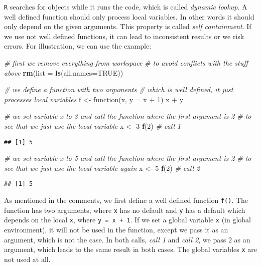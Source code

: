 \documentclass[11,]{article}
\newenvironment{Shaded}{\begin{snugshade}}{\end{snugshade}}
\newcommand{\KeywordTok}[1]{\textcolor[rgb]{0.13,0.29,0.53}{\textbf{{#1}}}}
\newcommand{\DataTypeTok}[1]{\textcolor[rgb]{0.13,0.29,0.53}{{#1}}}
\newcommand{\DecValTok}[1]{\textcolor[rgb]{0.00,0.00,0.81}{{#1}}}
\newcommand{\StringTok}[1]{\textcolor[rgb]{0.31,0.60,0.02}{{#1}}}
\newcommand{\CommentTok}[1]{\textcolor[rgb]{0.56,0.35,0.01}{\textit{{#1}}}}
\newcommand{\OtherTok}[1]{\textcolor[rgb]{0.56,0.35,0.01}{{#1}}}
\newcommand{\NormalTok}[1]{{#1}}
\begin{document}
\texttt{R} searches for objects while it runs the code, which is called
\emph{dynamic lookup}. A well defined function should only process local
variables. In other words it should only depend on the given arguments.
This property is called \emph{self containment}. If we use not well
defined functions, it can lead to inconsistent results or we risk
errors. For illustration, we can use the example:

\begin{Shaded}
\begin{Highlighting}[]
\CommentTok{# first we remove everything from workspace}
\CommentTok{# to avoid conflicts with the stuff above}
\KeywordTok{rm}\NormalTok{(}\DataTypeTok{list =} \KeywordTok{ls}\NormalTok{(}\DataTypeTok{all.names=}\OtherTok{TRUE}\NormalTok{))}

\CommentTok{# we define a function with two arguments}
\CommentTok{# which is well defined, it just processes local variables}
\NormalTok{f <-}\StringTok{ }\NormalTok{function(x, }\DataTypeTok{y =} \NormalTok{x +}\StringTok{ }\DecValTok{1}\NormalTok{) x +}\StringTok{ }\NormalTok{y}

\CommentTok{# we set variable x to 3 and call the function where the first argument is 2}
\CommentTok{# to see that we just use the local variable}
\NormalTok{x <-}\StringTok{ }\DecValTok{3}
\KeywordTok{f}\NormalTok{(}\DecValTok{2}\NormalTok{)  }\CommentTok{# call 1}
\end{Highlighting}
\end{Shaded}

\begin{verbatim}
## [1] 5
\end{verbatim}

\begin{Shaded}
\begin{Highlighting}[]
\CommentTok{# we set variable x to 5 and call the function where the first argument is 2}
\CommentTok{# to see that we just use the local variable again}
\NormalTok{x <-}\StringTok{ }\DecValTok{5}
\KeywordTok{f}\NormalTok{(}\DecValTok{2}\NormalTok{)  }\CommentTok{# call 2}
\end{Highlighting}
\end{Shaded}

\begin{verbatim}
## [1] 5
\end{verbatim}

As mentioned in the comments, we first define a well defined function
\texttt{f()}. The function has two arguments, where \texttt{x} has no
default and \texttt{y} has a default which depends on the local
\texttt{x}, where \texttt{y = x + 1}. If we set a global variable
\texttt{x} (in global environment), it will not be used in the function,
except we pass it as an argument, which is not the case. In both calls,
\emph{call 1} and \emph{call 2}, we pass \(2\) as an argument, which
leads to the same result in both cases. The global variables \texttt{x}
are not used at all.
\end{document}
